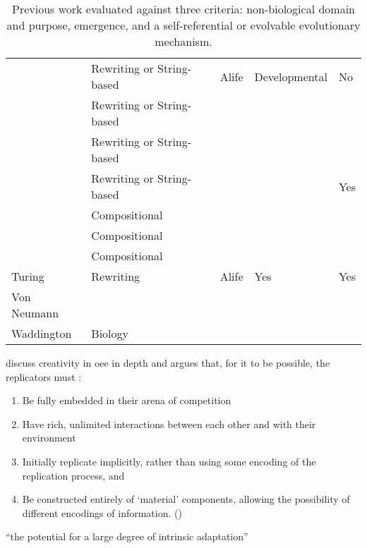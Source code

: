 \begin{sidewaystable}
\begin{center}
\begin{tabular}{@{}lllll@{}}
			\cite{Antonakopoulos:2011th}									&Rewriting or String-based	&Alife	&Developmental 	&No\\
			\cite{Dittrich1998}												&Rewriting or String-based&&&\\
			\cite{Fenizio2000}\cite{Fenizio2001}							&Rewriting or String-based&&&\\
			\cite{Fontana1992}												&Rewriting or String-based&&&Yes\\
			\cite{Segre1998}												&Compositional&&&\\
			\cite{Vasas2015, Vasas2012, Vasas2012a}							&Compositional&&&\\
			\cite{Kauffman1986}												&Compositional&&&\\
			Turing															&Rewriting 	&Alife	&Yes	&Yes\\
			Von Neumann														&&&&\\
			Waddington														&	Biology&&&\\
			\hline
		\end{tabular}
	\end{center}
	\caption{Previous work evaluated against three criteria: non-biological domain and purpose, emergence, and a self-referential or evolvable evolutionary mechanism.}
\end{sidewaystable}

\Textcite{Taylor2001,Taylor:1999sc} discuss creativity in \gls{oee} in depth and argues that, for it to be possible, the replicators must \parencite{Hutton2004}:
\begin{enumerate}
	\item Be fully embedded in their arena of competition 
	\item Have rich, unlimited interactions between each other and with their environment 
	\item Initially replicate implicitly, rather than using some encoding of the replication process, and 
	\item Be constructed entirely of `material' components, allowing the possibility of different encodings of information. ()
\end{enumerate}

``the potential for a large degree of intrinsic adaptation'' \parencite{Taylor2001}

